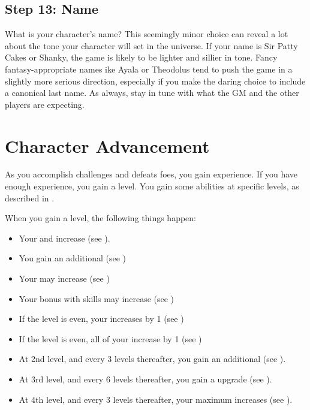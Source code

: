     \subsection{Step 13: Name}
        What is your character's name?
        This seemingly minor choice can reveal a lot about the tone your character will set in the universe.
        If your name is Sir Patty Cakes or Shanky, the game is likely to be lighter and sillier in tone.
        Fancy fantasy-appropriate names ike Ayala or Theodolus tend to push the game in a slightly more serious direction, especially if you make the daring choice to include a canonical last name.
        As always, stay in tune with what the GM and the other players are expecting.

\section{Character Advancement}\label{Character Advancement}

    As you accomplish challenges and defeats foes, you gain experience.
    If you have enough experience, you gain a level.
    You gain some abilities at specific levels, as described in .

    When you gain a level, the following things happen:
    \begin{itemize}
        \item Your  and  increase (see ).
        \item You gain an additional  (see )
        \item Your  may increase (see )
        \item Your bonus with  skills may increase (see )
        \item If the level is even, your  increases by 1 (see )
        \item If the level is even, all of your  increase by 1 (see )
        \item At 2nd level, and every 3 levels thereafter, you gain an additional  (see ).
        \item At 3rd level, and every 6 levels thereafter, you gain a  upgrade (see ).
        \item At 4th level, and every 3 levels thereafter, your maximum  increases (see ).
    \end{itemize}

